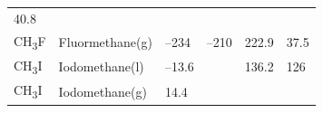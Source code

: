 \documentclass[
]{book}
\theoremstyle{definition}
\theoremstyle{definition}
\theoremstyle{definition}
\theoremstyle{remark}
\begin{document}
\begin{longtable}[]{@{}llllll@{}}
\begin{minipage}[t]{0.14\columnwidth}
40.8\strut
\end{minipage}\tabularnewline
\begin{minipage}[t]{0.07\columnwidth}\raggedright
CH\textsubscript{3}F\strut
\end{minipage} & \begin{minipage}[t]{0.17\columnwidth}\raggedright
Fluormethane(g)\strut
\end{minipage} & \begin{minipage}[t]{0.15\columnwidth}\raggedright
--234\strut
\end{minipage} & \begin{minipage}[t]{0.15\columnwidth}\raggedright
--210\strut
\end{minipage} & \begin{minipage}[t]{0.14\columnwidth}\raggedright
222.9\strut
\end{minipage} & \begin{minipage}[t]{0.14\columnwidth}\raggedright
37.5\strut
\end{minipage}\tabularnewline
\begin{minipage}[t]{0.07\columnwidth}\raggedright
CH\textsubscript{3}I\strut
\end{minipage} & \begin{minipage}[t]{0.17\columnwidth}\raggedright
Iodomethane(l)\strut
\end{minipage} & \begin{minipage}[t]{0.15\columnwidth}\raggedright
--13.6\strut
\end{minipage} & \begin{minipage}[t]{0.15\columnwidth}\raggedright
\strut
\end{minipage} & \begin{minipage}[t]{0.14\columnwidth}\raggedright
136.2\strut
\end{minipage} & \begin{minipage}[t]{0.14\columnwidth}\raggedright
126\strut
\end{minipage}\tabularnewline
\begin{minipage}[t]{0.07\columnwidth}\raggedright
CH\textsubscript{3}I\strut
\end{minipage} & \begin{minipage}[t]{0.17\columnwidth}\raggedright
Iodomethane(g)\strut
\end{minipage} & \begin{minipage}[t]{0.15\columnwidth}\raggedright
14.4\strut
\end{minipage} & \begin{minipage}[t]{0.15\columnwidth}\raggedright

\end{minipage}
\end{longtable}
\end{document}
